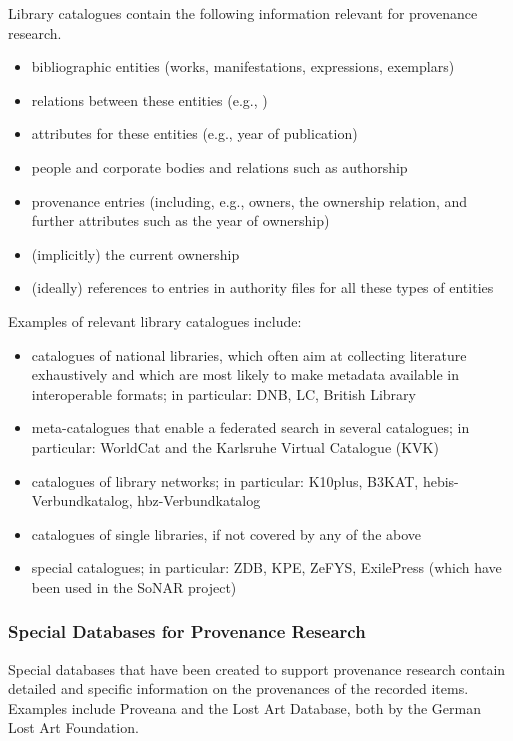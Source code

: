 Library catalogues contain the following information relevant for provenance research.
%
\begin{itemize}
  \item
    bibliographic entities (works, manifestations, expressions, exemplars) 
  \item
    relations between these entities (e.g., )
  \item
    attributes for these entities (e.g., year of publication)
  \item
    people and corporate bodies and relations such as authorship
  \item
    provenance entries (including, e.g., owners, the ownership relation, and further attributes such as the year of ownership)
  \item
    (implicitly) the current ownership
  \item
    (ideally) references to entries in authority files for all these types of entities
\end{itemize}
%
Examples of relevant library catalogues include:
%
\begin{itemize}
  \item
    catalogues of national libraries, which often aim at collecting literature exhaustively
    and which are most likely to make metadata available in interoperable formats;
    in particular: DNB, LC, British Library 
  \item
    meta-catalogues that enable a federated search in several catalogues;
    in particular: WorldCat and the Karlsruhe Virtual Catalogue (KVK)
  \item
    catalogues of library networks;
    in particular: K10plus, B3KAT, hebis-Verbundkatalog, hbz-Verbundkatalog
  \item
    catalogues of single libraries, if not covered by any of the above
  \item
    special catalogues;
    in particular: ZDB, KPE, ZeFYS, ExilePress (which have been used in the SoNAR project) 
\end{itemize}


\subsubsection{Special Databases for Provenance Research}

Special databases that have been created to support provenance research contain detailed and specific information on
the provenances of the recorded items.
Examples include Proveana and the Lost Art Database, both by the German Lost Art Foundation. 

